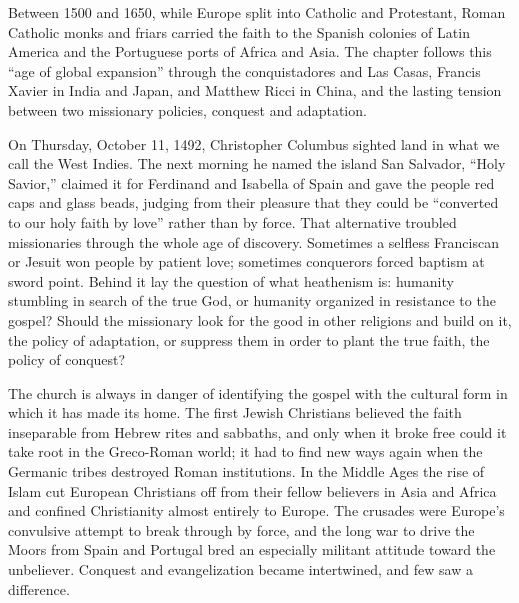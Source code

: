 
\begin{inbrief}
Between 1500 and 1650, while Europe split into Catholic and Protestant, Roman Catholic monks and
friars carried the faith to the Spanish colonies of Latin America and the Portuguese ports of Africa
and Asia. The chapter follows this ``age of global expansion'' through the conquistadores and Las
Casas, Francis Xavier in India and Japan, and Matthew Ricci in China, and the lasting tension between
two missionary policies, conquest and adaptation.
\end{inbrief}

On Thursday, October 11, 1492, Christopher Columbus sighted land in what we call the West Indies. The
next morning he named the island San Salvador, ``Holy Savior,'' claimed it for Ferdinand and Isabella
of Spain and gave the people red caps and glass beads, judging from their pleasure that they could be
``converted to our holy faith by love'' rather than by force. That alternative troubled missionaries
through the whole age of discovery. Sometimes a selfless Franciscan or Jesuit won people by patient
love; sometimes conquerors forced baptism at sword point. Behind it lay the question of what
heathenism is: humanity stumbling in search of the true God, or humanity organized in resistance to
the gospel? Should the missionary look for the good in other religions and build on it, the policy of
adaptation, or suppress them in order to plant the true faith, the policy of conquest?

The church is always in danger of identifying the gospel with the cultural form in which it has made
its home. The first Jewish Christians believed the faith inseparable from Hebrew rites and sabbaths,
and only when it broke free could it take root in the Greco-Roman world; it had to find new ways again
when the Germanic tribes destroyed Roman institutions. In the Middle Ages the rise of Islam cut
European Christians off from their fellow believers in Asia and Africa and confined Christianity
almost entirely to Europe. The crusades were Europe's convulsive attempt to break through by force,
and the long war to drive the Moors from Spain and Portugal bred an especially militant attitude
toward the unbeliever. Conquest and evangelization became intertwined, and few saw a difference.


